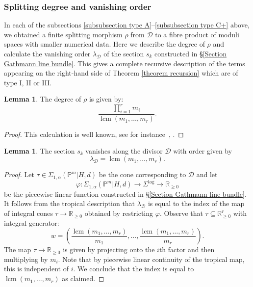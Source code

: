 \documentclass[11pt]{amsart}
\newcommand{\lcm}{\operatorname{lcm}}
\newcommand{\PP}{\mathbb P}
\renewcommand{\to}{\rightarrow}
\newcommand{\Dcal}{\mathcal{D}}
\newcommand{\RR}{\mathbb{R}}
\theoremstyle{definition}
\newtheorem{lemma}[thm]{Lemma}
\theoremstyle{definition}
\begin{document}
\subsubsection{Splitting degree and vanishing order} \label{subsubsection splitting degree} In each of the subsections \ref{subsubsection type A}--\ref{subsubsection type C+} above, we obtained a finite splitting morphism $\rho$ from $\Dcal$ to a fibre product of moduli spaces with smaller numerical data. Here we describe the degree of $\rho$ and calculate the vanishing order $\lambda_\Dcal$ of the section $s_k$ constructed in \S \ref{Section Gathmann line bundle}. This gives a complete recursive description of the terms appearing on the right-hand side of Theorem \ref{theorem recursion} which are of type I, II or III.

\begin{lemma}\label{lem:saturation} The degree of $\rho$ is given by:
\begin{equation*} \label{degree of gluing} \dfrac{\prod_{i=1}^r m_i}{\lcm(m_1,\ldots,m_r)}. \end{equation*}\end{lemma}
\begin{proof} This calculation is well known, see for instance~\cite[Section~7.9]{ChenDegeneration}, \cite[Section~5.3]{ACGSDecomposition}.
\end{proof}

\begin{lemma}\label{lemma vanishing order} The section $s_k$ vanishes along the divisor $\Dcal$ with order given by 
\[
\lambda_\Dcal = \lcm(m_1,\ldots,m_r).
\] 
\end{lemma}
\begin{proof} Let $\tau \in \Sigma_{1,\alpha}(\PP^m|H,d)$ be the cone corresponding to $\Dcal$ and let
\begin{equation*} \varphi \colon \Sigma_{1,\alpha}(\PP^m|H,d) \to \Sigma^{\log} \to \RR_{\geq 0} \end{equation*}
be the piecewise-linear function constructed in \S \ref{Section Gathmann line bundle}. It follows from the tropical description that $\lambda_\Dcal$ is equal to the index of the map of integral cones $\tau \to \RR_{\geq 0}$ obtained by restricting $\varphi$. Observe that $\tau \subseteq \RR_{\geq 0}^r$ with integral generator:
\begin{equation*} w = \left( \dfrac{\lcm(m_1,\ldots,m_r)}{m_1},\ldots,\dfrac{\lcm(m_1,\ldots,m_r)}{m_r} \right).\end{equation*}
The map $\tau \to \RR_{\geq 0}$ is given by projecting onto the $i$th factor and then multiplying by $m_i$. Note that by piecewise linear continuity of the tropical map, this is independent of $i$. We conclude that the index is equal to $\lcm(m_1,\ldots,m_r)$ as claimed.\end{proof}
\end{document}
